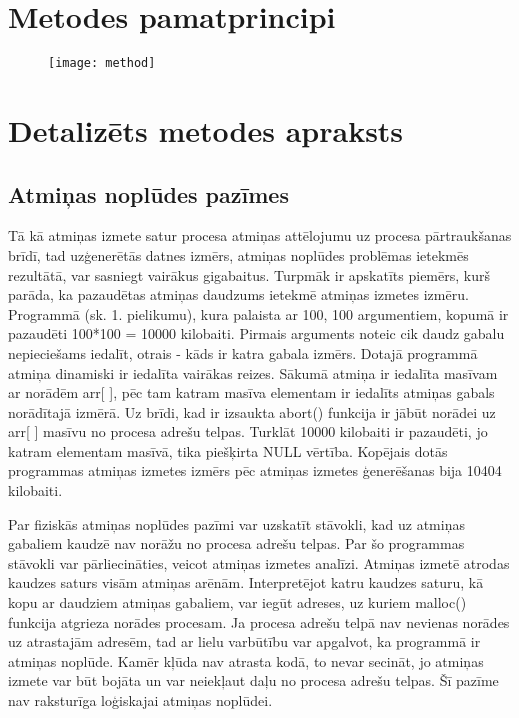 ﻿\section{Metodes pamatprincipi}

 \begin{figure}[h]
\begin{center}
\texttt{[image: method]}
\end{center}
\caption{\textbf{\fontsize{11}{12}\selectfont {Uz metodi balstītā algoritma blok-shēma}}}
\end{figure}

\section{Detalizēts metodes apraksts}




\subsection{Atmiņas noplūdes pazīmes}
Tā kā atmiņas izmete satur procesa atmiņas attēlojumu uz procesa pārtraukšanas brīdī, tad uzģenerētās datnes izmērs, atmiņas noplūdes problēmas ietekmēs rezultātā, var sasniegt vairākus gigabaitus.
Turpmāk ir apskatīts piemērs, kurš parāda, ka pazaudētas atmiņas daudzums ietekmē atmiņas izmetes izmēru.
Programmā (sk. 1. pielikumu), kura palaista ar 100, 100 argumentiem, kopumā ir pazaudēti 100*100 = 10000 kilobaiti. 
Pirmais arguments noteic cik daudz gabalu nepieciešams iedalīt, otrais - kāds ir katra gabala izmērs.
Dotajā programmā atmiņa dinamiski ir iedalīta vairākas reizes. 
Sākumā atmiņa ir iedalīta masīvam ar norādēm arr[ ], pēc tam katram masīva elementam ir iedalīts atmiņas gabals norādītajā izmērā.
Uz brīdi, kad ir izsaukta abort() funkcija ir jābūt norādei uz arr[ ] masīvu no procesa adrešu telpas.
Turklāt 10000 kilobaiti ir pazaudēti, jo  katram elementam masīvā, tika piešķirta NULL vērtība. 
Kopējais dotās programmas atmiņas izmetes izmērs pēc atmiņas izmetes ģenerēšanas bija 10404 kilobaiti.

Par fiziskās atmiņas noplūdes pazīmi var uzskatīt stāvokli, kad uz atmiņas gabaliem kaudzē nav norāžu no procesa adrešu telpas.
Par šo programmas stāvokli var pārliecināties, veicot atmiņas izmetes analīzi.
Atmiņas izmetē atrodas kaudzes saturs visām atmiņas arēnām.
Interpretējot katru kaudzes saturu, kā kopu ar daudziem atmiņas gabaliem, var iegūt adreses, uz kuriem malloc() funkcija atgrieza norādes procesam.
Ja procesa adrešu telpā nav nevienas norādes uz atrastajām adresēm, tad ar lielu varbūtību var apgalvot, ka programmā ir atmiņas noplūde.
Kamēr kļūda nav atrasta kodā, to nevar secināt, jo atmiņas izmete var būt bojāta un var neiekļaut daļu no procesa adrešu telpas.
Šī pazīme nav raksturīga loģiskajai atmiņas noplūdei.



